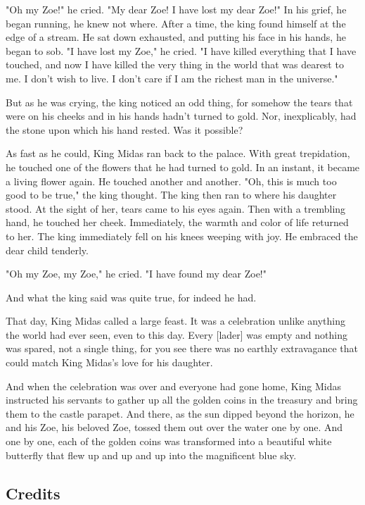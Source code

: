 "Oh my Zoe!" he cried. "My dear Zoe! I have lost my dear Zoe!" In his grief, he began running, he knew not where. After a time, the king found himself at the edge of a stream. He sat down exhausted, and putting his face in his hands, he began to sob. "I have lost my Zoe," he cried. "I have killed everything that I have touched, and now I have killed the very thing in the world that was dearest to me. I don't wish to live. I don't care if I am the richest man in the universe."

But as he was crying, the king noticed an odd thing, for somehow the tears that were on his cheeks and in his hands hadn't turned to gold. Nor, inexplicably, had the stone upon which his hand rested. Was it possible?

As fast as he could, King Midas ran back to the palace. With great trepidation, he touched one of the flowers that he had turned to gold. In an instant, it became a living flower again. He touched another and another. "Oh, this is much too good to be true," the king thought. The king then ran to where his daughter stood. At the sight of her, tears came to his eyes again. Then with a trembling hand, he touched her cheek. Immediately, the warmth and color of life returned to her. The king immediately fell on his knees weeping with joy. He embraced the dear child tenderly.

"Oh my Zoe, my Zoe," he cried. "I have found my dear Zoe!"

And what the king said was quite true, for indeed he had.

That day, King Midas called a large feast. It was a celebration unlike anything the world had ever seen, even to this day. Every [lader] was empty and nothing was spared, not a single thing, for you see there was no earthly extravagance that could match King Midas's love for his daughter.

And when the celebration was over and everyone had gone home, King Midas instructed his servants to gather up all the golden coins in the treasury and bring them to the castle parapet. And there, as the sun dipped beyond the horizon, he and his Zoe, his beloved Zoe, tossed them out over the water one by one. And one by one, each of the golden coins was transformed into a beautiful white butterfly that flew up and up and up into the magnificent blue sky.

\subsection{Credits}

